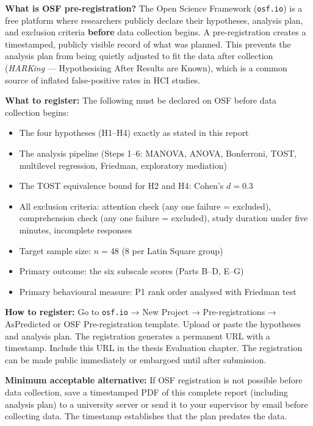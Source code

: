 \documentclass[11pt, a4paper]{article}
\begin{document}
\begin{warnbox}
\small\textbf{What is OSF pre-registration?} The Open Science Framework (\texttt{osf.io}) is a free platform where researchers publicly declare their hypotheses, analysis plan, and exclusion criteria \textbf{before} data collection begins. A pre-registration creates a timestamped, publicly visible record of what was planned. This prevents the analysis plan from being quietly adjusted to fit the data after collection (\textit{HARKing} --- Hypothesising After Results are Known), which is a common source of inflated false-positive rates in HCI studies.

\textbf{What to register:} The following must be declared on OSF before data collection begins:
\begin{itemize}[topsep=2pt, itemsep=2pt]
  \item The four hypotheses (H1--H4) exactly as stated in this report
  \item The analysis pipeline (Steps 1--6: MANOVA, ANOVA, Bonferroni, TOST, multilevel regression, Friedman, exploratory mediation)
  \item The TOST equivalence bound for H2 and H4: Cohen's $d = 0.3$
  \item All exclusion criteria: attention check (any one failure = excluded), comprehension check (any one failure = excluded), study duration under five minutes, incomplete responses
  \item Target sample size: $n = 48$ (8 per Latin Square group)
  \item Primary outcome: the six subscale scores (Parts B--D, E--G)
  \item Primary behavioural measure: P1 rank order analysed with Friedman test
\end{itemize}

\textbf{How to register:} Go to \texttt{osf.io} → New Project → Pre-registrations → AsPredicted or OSF Pre-registration template. Upload or paste the hypotheses and analysis plan. The registration generates a permanent URL with a timestamp. Include this URL in the thesis Evaluation chapter. The registration can be made public immediately or embargoed until after submission.

\textbf{Minimum acceptable alternative:} If OSF registration is not possible before data collection, save a timestamped PDF of this complete report (including analysis plan) to a university server or send it to your supervisor by email before collecting data. The timestamp establishes that the plan predates the data.
\end{warnbox}
\end{document}
